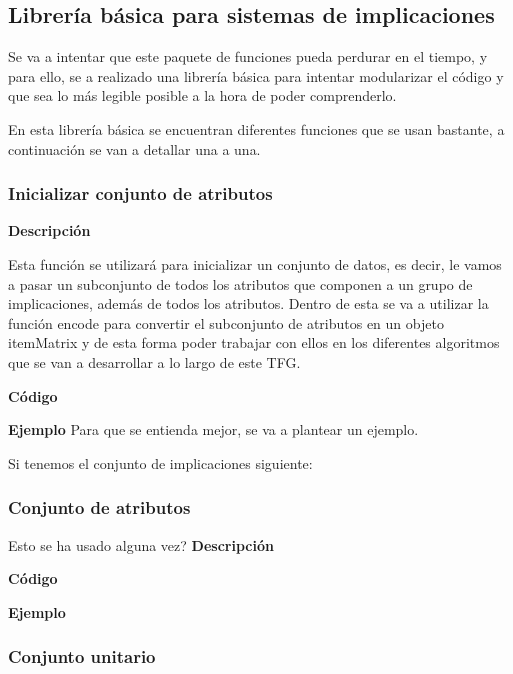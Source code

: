 \subsection{Librer\'ia b\'asica para sistemas de implicaciones}
Se va a intentar que este paquete de funciones pueda perdurar en el tiempo, y para ello, 
se a realizado una librer\'ia b\'asica para intentar modularizar el c\'odigo y que sea lo 
m\'as legible posible a la hora de poder comprenderlo.

En esta librer\'ia b\'asica se encuentran diferentes funciones que se usan bastante, a continuaci\'on 
se van a detallar una a una.




\subsubsection{Inicializar conjunto de atributos}

    \textbf{Descripci\'on}

    Esta funci\'on se utilizar\'a para inicializar un conjunto de datos, es decir, le vamos a pasar un subconjunto 
    de todos los atributos que componen a un grupo de implicaciones, adem\'as de todos los atributos. Dentro de esta 
    se va a utilizar la funci\'on encode para convertir el subconjunto de atributos en un objeto itemMatrix y de esta 
    forma poder trabajar con ellos en los diferentes algoritmos que se van a desarrollar a lo largo de este TFG.


    \textbf{C\'odigo}



    \textbf{Ejemplo}
    Para que se entienda mejor, se va a plantear un ejemplo. 

    Si tenemos el conjunto de implicaciones siguiente: 





\subsubsection{Conjunto de atributos}
    Esto se ha usado alguna vez?
    \textbf{Descripci\'on}
    

    \textbf{C\'odigo}

    
    \textbf{Ejemplo}



\subsubsection{Conjunto unitario}

